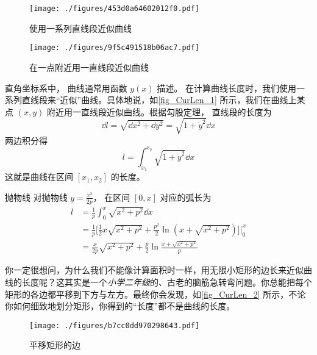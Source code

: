 

\begin{figure}[ht]
\centering
\texttt{[image: ./figures/453d0a64602012f0.pdf]}
\caption{使用一系列直线段近似曲线} \label{fig_CurLen_3}
\end{figure}

\begin{figure}[ht]
\centering
\texttt{[image: ./figures/9f5c491518b06ac7.pdf]}
\caption{在一点附近用一直线段近似曲线} \label{fig_CurLen_1}
\end{figure}

直角坐标系中， 曲线通常用函数 $y(x)$ 描述。 在计算曲线长度时，我们使用一系列直线段来“近似”曲线。具体地说，如\autoref{fig_CurLen_1} 所示，我们在曲线上某点 $(x, y)$ 附近用一直线段近似曲线。根据勾股定理， 直线段的长度为
\begin{equation}
\dd{l} = \sqrt{\dd{x}^2 + \dd{y}^2} = \sqrt{1 + \dot y^2} \dd{x}
\end{equation}
两边积分得
\begin{equation}\label{eq_CurLen_1}
l = \int_{x_1}^{x_2} \sqrt{1 + \dot y^2} \dd{x}
\end{equation}
这就是曲线在区间 $[x_1, x_2]$ 的长度。

\begin{example}{抛物线}
对抛物线 $y=\frac{x^2}{2p}$， 在区间 $[0,x]$ 对应的弧长为
\begin{equation}
\begin{aligned}
l& = \frac{1}{p}\int_{0}^{x}\sqrt{x^2+p^2}\dd{x}\\
&=\frac{1}{p}\bigg[\frac{1}{2}x\sqrt{x^2+p^2}+\frac{p^2}{2}\ln(x+\sqrt{x^2+p^2})\bigg]\Bigg\lvert_{0}^{x}\\
&=\frac{x}{2p}\sqrt{x^2+p^2}+\frac{p}{2}\ln\frac{x+\sqrt{x^2+p^2}}{p}
\end{aligned}
\end{equation}
\end{example}

你一定很想问，为什么我们不能像计算面积时一样，用无限小矩形的边长来近似曲线的长度呢？这其实是一个\textsl{小学二年级}的、古老的脑筋急转弯问题。你总能把每个矩形的各边都平移到下方与左方。最终你会发现，如\autoref{fig_CurLen_2} 所示，不论你如何细致地划分矩形，你得到的“长度”都不是曲线的长度。
\begin{figure}[ht]
\centering
\texttt{[image: ./figures/b7cc0dd970298643.pdf]}
\caption{平移矩形的边} \label{fig_CurLen_2}
\end{figure}

